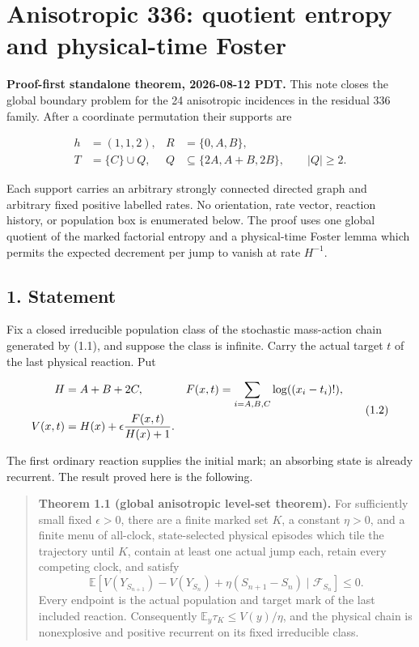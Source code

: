 \section{Anisotropic 336: quotient entropy and physical-time
Foster}

\textbf{Proof-first standalone theorem, 2026-08-12 PDT.} This note
closes the global boundary problem for the 24 anisotropic incidences in
the residual 336 family. After a coordinate permutation their supports
are

\[
 \begin{aligned}
 h&=(1,1,2), & R&=\{0,A,B\},\\
 T&=\{C\}\cup Q, &
 Q&\subseteq\{2A,A+B,2B\},\qquad |Q|\ge2 .
 \end{aligned}                                         \tag{1.1}
\]

Each support carries an arbitrary strongly connected directed graph and
arbitrary fixed positive labelled rates. No orientation, rate vector,
reaction history, or population box is enumerated below. The proof uses
one global quotient of the marked factorial entropy and a physical-time
Foster lemma which permits the expected decrement per jump to vanish at
rate \(H^{-1}\).

\subsection{1. Statement}

Fix a closed irreducible population class of the stochastic mass-action
chain generated by (1.1), and suppose the class is infinite. Carry the
actual target \(t\) of the last physical reaction. Put

\[
 \begin{aligned}
 H&=A+B+2C,
 &F(x,t)&=\sum_{i=A,B,C}\log((x_i-t_i)!),\\
 V(x,t)&=H(x)+\epsilon {F(x,t)\over H(x)+1}.&&
 \end{aligned}                                         \tag{1.2}
\]

The first ordinary reaction supplies the initial mark; an absorbing
state is already recurrent. The result proved here is the following.

\begin{quote}
\textbf{Theorem 1.1 (global anisotropic level-set theorem).} For
sufficiently small fixed \(\epsilon>0\), there are a finite marked set
\(K\), a constant \(\eta>0\), and a finite menu of all-clock,
state-selected physical episodes which tile the trajectory until \(K\),
contain at least one actual jump each, retain every competing clock, and
satisfy \[
 \mathbb E\!\left[
  V(Y_{S_{n+1}})-V(Y_{S_n})+\eta(S_{n+1}-S_n)
     \mid\mathcal F_{S_n}\right]\le0 .               \tag{1.3}
\] Every endpoint is the actual population and target mark of the last
included reaction. Consequently \(\mathbb E_y\tau_K\le V(y)/\eta\), and
the physical chain is nonexplosive and positive recurrent on its fixed
irreducible class.
\end{quote}

